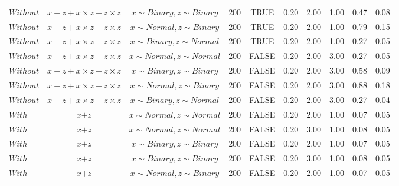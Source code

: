 \begin{longtable}{lccccccccc}
  $Without$ & $\textit{x} + \textit{z} + \textit{x} \times \textit{z} + \textit{z} \times \textit{z}$ & $\textit{x} \sim Binary, \textit{z} \sim Binary$ & 200 & TRUE & 0.20 & 2.00 & 1.00 & 0.47 & 0.08 \\ 
  $Without$ & $\textit{x} + \textit{z} + \textit{x} \times \textit{z} + \textit{z} \times \textit{z}$ & $\textit{x} \sim Normal, \textit{z} \sim Binary$ & 200 & TRUE & 0.20 & 2.00 & 1.00 & 0.79 & 0.15 \\ 
  $Without$ & $\textit{x} + \textit{z} + \textit{x} \times \textit{z} + \textit{z} \times \textit{z}$ & $\textit{x} \sim Binary, \textit{z} \sim Normal$ & 200 & TRUE & 0.20 & 2.00 & 1.00 & 0.27 & 0.05 \\ 
  $Without$ & $\textit{x} + \textit{z} + \textit{x} \times \textit{z} + \textit{z} \times \textit{z}$ & $\textit{x} \sim Normal , \textit{z} \sim Normal$ & 200 & FALSE & 0.20 & 2.00 & 3.00 & 0.27 & 0.05 \\ 
  $Without$ & $\textit{x} + \textit{z} + \textit{x} \times \textit{z} + \textit{z} \times \textit{z}$ & $\textit{x} \sim Binary, \textit{z} \sim Binary$ & 200 & FALSE & 0.20 & 2.00 & 3.00 & 0.58 & 0.09 \\ 
  $Without$ & $\textit{x} + \textit{z} + \textit{x} \times \textit{z} + \textit{z} \times \textit{z}$ & $\textit{x} \sim Normal, \textit{z} \sim Binary$ & 200 & FALSE & 0.20 & 2.00 & 3.00 & 0.88 & 0.18 \\ 
  $Without$ & $\textit{x} + \textit{z} + \textit{x} \times \textit{z} + \textit{z} \times \textit{z}$ & $\textit{x} \sim Binary, \textit{z} \sim Normal$ & 200 & FALSE & 0.20 & 2.00 & 3.00 & 0.27 & 0.04 \\ 
  $With$ & $\textit{x} + \textit{z}$ & $\textit{x} \sim Normal , \textit{z} \sim Normal$ & 200 & FALSE & 0.20 & 2.00 & 1.00 & 0.07 & 0.05 \\ 
  $With$ & $\textit{x} + \textit{z}$ & $\textit{x} \sim Normal , \textit{z} \sim Normal$ & 200 & FALSE & 0.20 & 3.00 & 1.00 & 0.08 & 0.05 \\ 
  $With$ & $\textit{x} + \textit{z}$ & $\textit{x} \sim Binary, \textit{z} \sim Binary$ & 200 & FALSE & 0.20 & 2.00 & 1.00 & 0.07 & 0.05 \\ 
  $With$ & $\textit{x} + \textit{z}$ & $\textit{x} \sim Binary, \textit{z} \sim Binary$ & 200 & FALSE & 0.20 & 3.00 & 1.00 & 0.08 & 0.05 \\ 
  $With$ & $\textit{x} + \textit{z}$ & $\textit{x} \sim Normal, \textit{z} \sim Binary$ & 200 & FALSE & 0.20 & 2.00 & 1.00 & 0.07 & 0.05 \\ 

\end{longtable}
